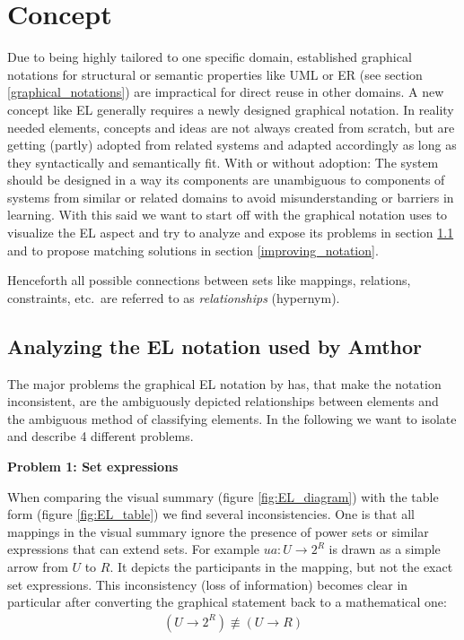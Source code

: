 \documentclass[twoside, openright, 12pt]{book}
\begin{document}
\section{Concept}
\label{gsl_concept}

Due to being highly tailored to one specific domain, established graphical notations for structural or semantic properties like UML or ER (see section \ref{graphical_notations}) are impractical for direct reuse in other domains.
A new concept like EL generally requires a newly designed graphical notation.
In reality needed elements, concepts and ideas are not always created from scratch, but are getting (partly) adopted from related systems and adapted accordingly as long as they syntactically and semantically fit.
With or without adoption: The system should be designed in a way its components are unambiguous to components of systems from similar or related domains to avoid misunderstanding or barriers in learning.
With this said we want to start off with the graphical notation \cite{Amthor18} uses to visualize the EL aspect and try to analyze and expose its problems in section \ref{analyzing_notation} and to propose matching solutions in section \ref{improving_notation}.

\begin{mdframed}[style=mystyle,frametitle=Note]
Henceforth all possible connections between sets like mappings, relations, constraints, etc.~are referred to as \textit{relationships} (hypernym).
\end{mdframed}



\subsection{Analyzing the EL notation used by Amthor}
\label{analyzing_notation}
The major problems the graphical EL notation by \cite{Amthor18} has, that make the notation inconsistent, are the ambiguously depicted relationships between elements and the ambiguous method of classifying elements.
In the following we want to isolate and describe 4 different problems.

\vspace{6mm}
\noindent
\textbf{Problem 1: Set expressions}
\vspace{1mm}

\noindent
When comparing the visual summary (figure \ref{fig:EL_diagram}) with the table form (figure \ref{fig:EL_table}) we find several inconsistencies.
One is that all mappings in the visual summary ignore the presence of power sets or similar expressions that can extend sets.
For example $ua: U \rightarrow 2^R$ is drawn as a simple arrow from $U$ to $R$.
It depicts the participants in the mapping, but not the exact set expressions.
This inconsistency (loss of information) becomes clear in particular after converting the graphical statement back to a mathematical one:
\begin{align}
(U \rightarrow 2^R) \not\equiv (U \rightarrow R)
\end{align}
\end{document}
